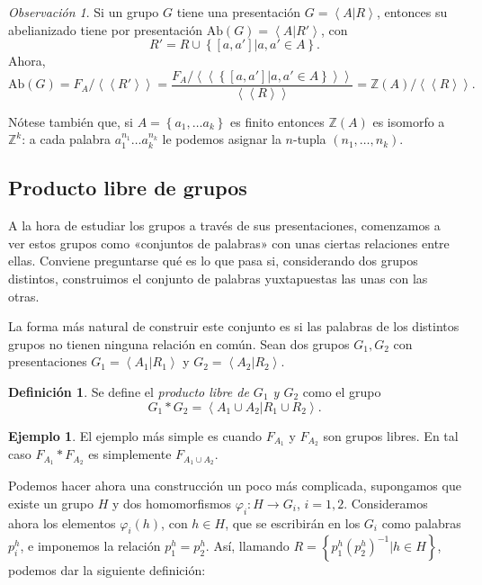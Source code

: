 \documentclass[12pt,a4paper]{book}
\theoremstyle{definition} \newtheorem{defn}[thm]{Definición}
\theoremstyle{definition} \newtheorem{ejemplo}[thm]{Ejemplo}
\theoremstyle{definition} \newtheorem{ejercicio}[thm]{Ejercicio}
\theoremstyle{remark} \newtheorem*{obs}{Observación}
\def\ZZ{\mathbb{Z}}
\def\ab{\mathrm{Ab}}
\newcommand\gen[1]{\left\langle #1 \right\rangle}
\newcommand\ngen[1]{\left\langle\left\langle #1 \right\rangle \right\rangle}
\begin{document}
 \begin{obs}
   Si un grupo $G$ tiene una presentación $G=\gen{A|R}$, entonces su abelianizado tiene por presentación $\ab(G)=\gen{A|R'}$, con 
   \begin{equation*}
     R'=R\cup \left\{ [a,a'] |a,a' \in A \right\}.
   \end{equation*}
   Ahora, $$\ab(G)=F_A/\ngen{R'}=\frac{F_A/\ngen{\left\{ [a,a']|a,a'\in A \right\}}}{\ngen{R}}=\ZZ(A)/\ngen{R}.$$

   Nótese también que, si $A=\left\{ a_1,\dots a_k \right\}$ es finito entonces $\ZZ(A)$ es isomorfo a $\ZZ^k$: a cada palabra $a_1^{n_1}\dots a_k^{n_k}$ le podemos asignar la $n$-tupla $(n_1,\dots,n_k)$.
 \end{obs}

 \subsection{Producto libre de grupos}
 A la hora de estudiar los grupos a través de sus presentaciones, comenzamos a ver estos grupos como «conjuntos de palabras» con unas ciertas relaciones entre ellas. Conviene preguntarse qué es lo que pasa si, considerando dos grupos distintos, construimos el conjunto de palabras yuxtapuestas las unas con las otras. 

 La forma más natural de construir este conjunto es si las palabras de los distintos grupos no tienen ninguna relación en común. Sean dos grupos $G_1,G_2$ con presentaciones $G_1=\gen{A_1|R_1}$ y $G_2=\gen{A_2|R_2}$.
 \begin{defn}
    Se define el \emph{producto libre de $G_1$ y $G_2$} como el grupo
   \begin{equation*}
     G_1*G_2=\gen{A_1\cup A_2|R_1\cup R_2}.
   \end{equation*}
 \end{defn}

 \begin{ejemplo}
   El ejemplo más simple es cuando $F_{A_1}$ y $F_{A_2}$ son grupos libres. En tal caso $F_{A_1}*F_{A_2}$ es simplemente $F_{A_1\cup A_2}$.
 \end{ejemplo}

 Podemos hacer ahora una construcción un poco más complicada, supongamos que existe un grupo $H$ y dos homomorfismos $\varphi_i:H\rightarrow G_i$, $i=1,2$. Consideramos ahora los elementos $\varphi_i(h)$, con $h\in H$, que se escribirán en los $G_i$ como palabras $p_i^h$, e imponemos la relación $p_1^h=p_2^h$. Así, llamando $R=\left\{ p_1^h(p_2^h)^{-1}|h\in H \right\}$, podemos dar la siguiente definición:
\end{document}
